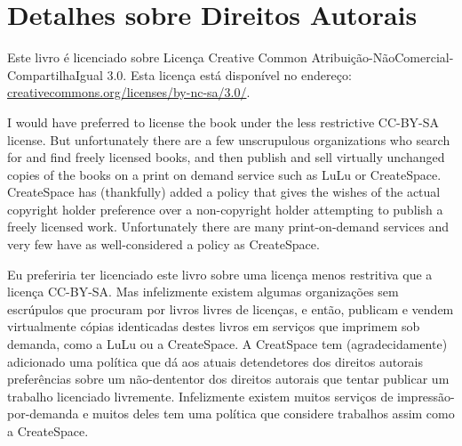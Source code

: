 
\chapter{Detalhes sobre Direitos Autorais}

Este livro é licenciado sobre Licença Creative Common
Atribuição-NãoComercial-CompartilhaIgual 3.0. Esta licença está disponível
no endereço: \url{creativecommons.org/licenses/by-nc-sa/3.0/}.

I would have preferred to license the book under the less 
restrictive CC-BY-SA license.   But unfortunately there are
a few unscrupulous
organizations who search for and find freely licensed books,
and then publish and sell virtually unchanged copies of the books on a 
print on demand service such as LuLu or CreateSpace.  CreateSpace
has (thankfully) added a policy that gives the wishes of the actual 
copyright holder preference over a non-copyright holder attempting 
to publish a freely licensed work.  Unfortunately there are many 
print-on-demand services and very few have as well-considered a policy 
as CreateSpace.

Eu preferiria ter licenciado este livro sobre uma licença menos restritiva 
que a licença CC-BY-SA. Mas infelizmente existem algumas organizações sem
escrúpulos que procuram por livros livres de licenças, e então, publicam e 
vendem virtualmente cópias identicadas destes livros em serviços que imprimem
sob demanda, como a LuLu ou a CreateSpace. A CreatSpace tem (agradecidamente)
adicionado uma política que dá aos atuais detendetores dos direitos autorais 
preferências sobre um não-dententor dos direitos autorais que tentar publicar 
um trabalho licenciado livremente. Infelizmente existem muitos serviços de 
impressão-por-demanda e muitos deles tem uma política que considere trabalhos
assim como a CreateSpace.


